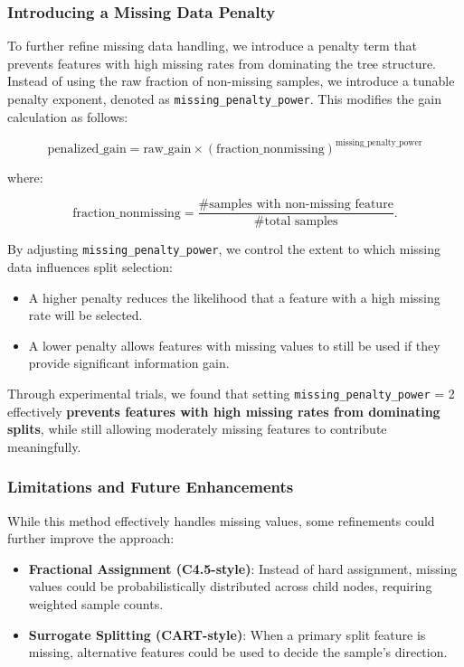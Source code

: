 \documentclass[12pt]{article}
\begin{document}
\subsubsection{Introducing a Missing Data Penalty}
To further refine missing data handling, we introduce a penalty term that prevents features with high missing rates from dominating the tree structure. Instead of using the raw fraction of non-missing samples, we introduce a tunable penalty exponent, denoted as \texttt{missing\_penalty\_power}. This modifies the gain calculation as follows:

\begin{equation}
    \text{penalized\_gain} = \text{raw\_gain} \times (\text{fraction\_nonmissing})^{\text{missing\_penalty\_power}}
\end{equation}

where:

\begin{equation}
    \text{fraction\_nonmissing} = \frac{\#\text{samples with non-missing feature}}{\#\text{total samples}}.
\end{equation}

By adjusting \texttt{missing\_penalty\_power}, we control the extent to which missing data influences split selection:
\begin{itemize}
    \item A higher penalty reduces the likelihood that a feature with a high missing rate will be selected.
    \item A lower penalty allows features with missing values to still be used if they provide significant information gain.
\end{itemize}

Through experimental trials, we found that setting \texttt{missing\_penalty\_power} = 2 effectively \textbf{prevents features with high missing rates from dominating splits}, while still allowing moderately missing features to contribute meaningfully.

\subsubsection{Limitations and Future Enhancements}
While this method effectively handles missing values, some refinements could further improve the approach:
\begin{itemize}
    \item \textbf{Fractional Assignment (C4.5-style)}: Instead of hard assignment, missing values could be probabilistically distributed across child nodes, requiring weighted sample counts.
    \item \textbf{Surrogate Splitting (CART-style)}: When a primary split feature is missing, alternative features could be used to decide the sample’s direction.
\end{itemize}
\end{document}
